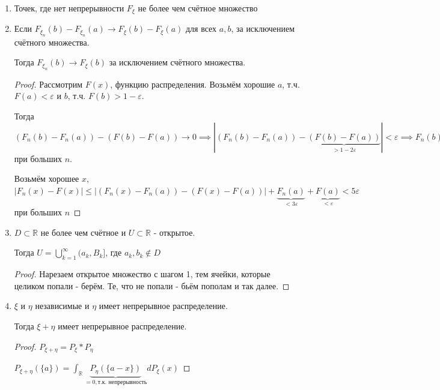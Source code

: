 \begin{remark}
    \begin{enumerate}
        \item {
            Точек, где нет непрерывности $F_{\xi}$ не более чем счётное множество

        }
        \item {
            Если $F_{\xi_n}(b) - F_{\xi_n} (a) \rightarrow F_{\xi}(b) - F_{\xi}(a)$ для всех $a, b$, за исключением счётного множества.
            
            Тогда $F_{\xi_n}(b) \rightarrow F_{\xi} (b)$ за исключением счётного множества.

            \begin{proof}
                Рассмотрим $F(x)$, функцию распределения. Возьмём хорошие $a$, т.ч. $F(a) < \varepsilon$ и 
                $b$, т.ч. $F(b) > 1 - \varepsilon$.
                
                Тогда $(F_n(b) - F_n (a)) - (F(b) - F(a)) \rightarrow 0 \implies 
                |(F_n(b) - F_n(a)) - \underbrace{(F(b) - F(a))}_{> 1 - 2\varepsilon}| < \varepsilon \implies F_n(b) - F_n(a) > 1 - 3\varepsilon \implies F_n(a) < 3\varepsilon$ при больших $n$.

                Возьмём хорошее $x$, $|F_n(x) - F(x)| \leqslant |(F_n(x) - F_n(a)) - (F(x) - F(a))| + \underbrace{F_n(a)}_{<3\varepsilon} + \underbrace{F(a)}_{<\varepsilon} < 5\varepsilon$ при больших $n$
            \end{proof}
        }
        \item {
            $D \subset \mathbb{R}$ не более чем счётное и $U \subset \mathbb{R}$ - открытое.

            Тогда $U = \bigcup_{k = 1}^{\infty} (a_k, B_k]$, где $a_k, b_k \not \in D$

            \begin{proof}
                Нарезаем открытое множество с шагом 1, тем ячейки, которые целиком попали - берём. Те, что не попали - бьём пополам и так далее.
            \end{proof}
        }
        \item {
            $\xi$ и $\eta$ независимые и $\eta$ имеет непрерывное распределение.

            Тогда $\xi + \eta$ имеет непрерывное распределение.

            \begin{proof}
                $P_{\xi + \eta} = P_{\xi} * P_{\eta}$

                $P_{\xi + \eta} (\{ a \}) = \int_{\mathbb{R}} \underbrace{P_{\eta} ( \{ a - x \} )}_{= 0, \text{т.к. непрерывность}}  dP_{\xi} (x) $
            \end{proof}
        }
    \end{enumerate}
\end{remark}

